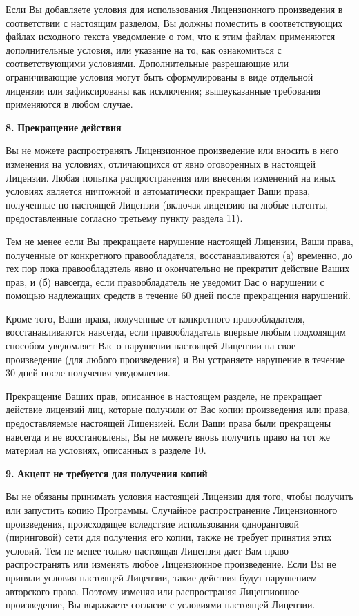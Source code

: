 Если Вы добавляете условия для использования Лицензионного произведения в соответствии с настоящим разделом, Вы должны поместить в соответствующих файлах исходного текста уведомление о том, что к этим файлам применяются дополнительные условия, или указание на то, как ознакомиться с соответствующими условиями. Дополнительные разрешающие или ограничивающие условия могут быть сформулированы в виде отдельной лицензии или зафиксированы как исключения; вышеуказанные требования применяются в любом случае.

{\bfseries{8.}} {\bfseries{Прекращение}} {\bfseries{действия}}

Вы не можете распространять Лицензионное произведение или вносить в него изменения на условиях, отличающихся от явно оговоренных в настоящей Лицензии. Любая попытка распространения или внесения изменений на иных условиях является ничтожной и автоматически прекращает Ваши права, полученные по настоящей Лицензии (включая лицензию на любые патенты, предоставленные согласно третьему пункту раздела 11).

Тем не менее если Вы прекращаете нарушение настоящей Лицензии, Ваши права, полученные от конкретного правообладателя, восстанавливаются (а) временно, до тех пор пока правообладатель явно и окончательно не прекратит действие Ваших прав, и (б) навсегда, если правообладатель не уведомит Вас о нарушении с помощью надлежащих средств в течение 60 дней после прекращения нарушений.

Кроме того, Ваши права, полученные от конкретного правообладателя, восстанавливаются навсегда, если правообладатель впервые любым подходящим способом уведомляет Вас о нарушении настоящей Лицензии на свое произведение (для любого произведения) и Вы устраняете нарушение в течение 30 дней после получения уведомления.

Прекращение Ваших прав, описанное в настоящем разделе, не прекращает действие лицензий лиц, которые получили от Вас копии произведения или права, предоставляемые настоящей Лицензией. Если Ваши права были прекращены навсегда и не восстановлены, Вы не можете вновь получить право на тот же материал на условиях, описанных в разделе 10.

{\bfseries{9.}} {\bfseries{Акцепт}} {\bfseries{не}} {\bfseries{требуется}} {\bfseries{для}} {\bfseries{получения}} {\bfseries{копий}}

Вы не обязаны принимать условия настоящей Лицензии для того, чтобы получить или запустить копию Программы. Случайное распространение Лицензионного произведения, происходящее вследствие использования одноранговой (пиринговой) сети для получения его копии, также не требует принятия этих условий. Тем не менее только настоящая Лицензия дает Вам право распространять или изменять любое Лицензионное произведение. Если Вы не приняли условия настоящей Лицензии, такие действия будут нарушением авторского права. Поэтому изменяя или распространяя Лицензионное произведение, Вы выражаете согласие с условиями настоящей Лицензии.

